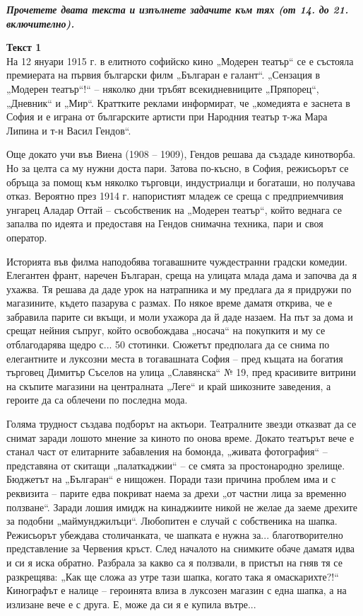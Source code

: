 \documentclass[12pt,a4paper]{article}
\begin{document}
\vspace{0.6cm}

\noindent
\textbf{\textit{Прочетете двата текста и изпълнете задачите към тях (от 14. до 21. включително).}}

\vspace{0.3cm}
\noindent\textbf{Текст 1} \\
На 12 януари 1915 г. в елитното софийско кино „Модерен театър“ се е състояла премиерата на първия български филм „Българан е галант“. „Сензация в „Модерен театър“!“ – няколко дни тръбят всекидневниците „Пряпорец“, „Дневник“ и „Мир“. Краттките реклами информират, че „комедията е заснета в София и е играна от българските артисти при Народния театър т-жа Мара Липина и т-н Васил Гендов“. 

Още докато учи във Виена (1908 – 1909), Гендов решава да създаде кинотворба. Но за целта са му нужни доста пари. Затова по-късно, в София, режисьорът се обръща за помощ към няколко търговци, индустриалци и богаташи, но получава отказ. Вероятно през 1914 г. напористият младеж се среща с предприемчивия унгарец Аладар Оттай – съсобственик на „Модерен театър“, който веднага се запалва по идеята и предоставя на Гендов снимачна техника, пари и своя оператор.

Историята във филма наподобява тогавашните чуждестранни градски комедии. Елегантен франт, наречен Българан, среща на улицата млада дама и започва да я ухажва. Тя решава да даде урок на натрапника и му предлага да я придружи по магазините, където пазарува с размах. По някое време даматя открива, че е забравила парите си вкъщи, и моли ухажора да й даде назаем. На път за дома и срещат нейния съпруг, който освобождава „носача“ на покупкитя и му се отблагодарява щедро с... 50 стотинки. Сюжетът предполага да се снима по елегантните и луксозни места в тогавашната София – пред къщата на богатия търговец Димитър Съселов на улица „Славянска“ № 19, пред красивите витрини на скъпите магазини на централната „Леге“ и край шикозните заведения, а героите да са облечени по последна мода.

Голяма трудност създава подборът на актьори. Театралните звезди отказват да се снимат заради лошото мнение за киното по онова време. Докато театърът вече е станал част от елитарните забавления на бомонда, „живата фотография“ – представяна от скитащи „палаткаджии“ – се смята за простонародно зрелище. Бюджетът на „Българан“ е нищожен. Поради тази причина проблем има и с реквизита – парите едва покриват наема за дрехи „от частни лица за временно ползване“. Заради лошия имидж на кинаджиите никой не желае да заеме дрехите за подобни „маймунджилъци“. Любопитен е случай с собственика на шапка. Режисьорът убеждава столичанката, че шапката е нужна за... благотворително представление за Червения кръст. След началото на снимките обаче даматя идва и си я иска обратно. Разбрала за какво са я ползвали, в пристъп на гняв тя се разкрещява: „Как ще сложа аз утре тази шапка, когато така я омаскарихте?!“ Кинографът е налице – героинята влиза в луксозен магазин с една шапка, а на излизане вече е с друга. Е, може да си я е купила вътре...
\end{document}
